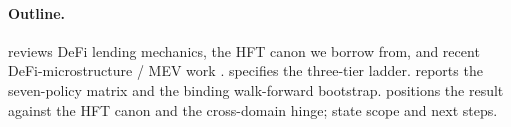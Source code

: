 \paragraph{Outline.}
 reviews DeFi lending mechanics, the HFT
canon we borrow from, and recent DeFi-microstructure / MEV work
\cite{capponi2025mev, lehar2024fragility}.
 specifies the three-tier ladder.
 reports the seven-policy matrix and the
binding walk-forward bootstrap.   positions
the result against the HFT canon and the cross-domain hinge;
 state scope and next steps.
